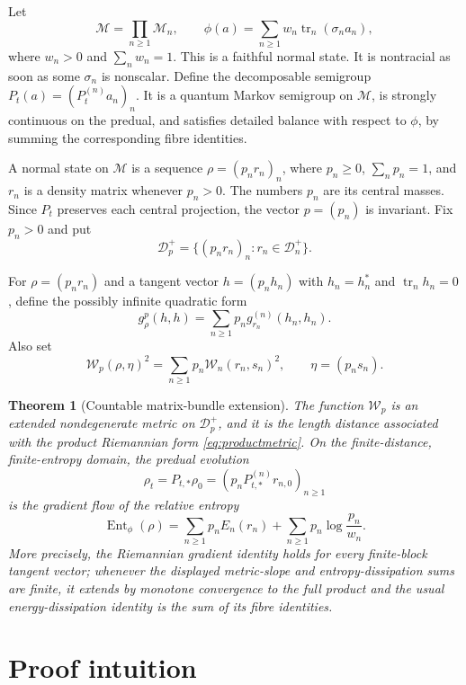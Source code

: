 \documentclass[11pt]{article}
\newtheorem{theorem}{Theorem}
\newcommand{\M}{\mathcal M}
\newcommand{\D}{\mathcal D}
\newcommand{\W}{\mathcal W}
\newcommand{\tr}{\operatorname{tr}}
\newcommand{\Ent}{\operatorname{Ent}}
\begin{document}
Let
\[
  \M=\prod_{n\geq1}\M_n,
  \qquad
  \phi(a)=\sum_{n\geq1}w_n\tr_n(\sigma_n a_n),
\]
where $w_n>0$ and $\sum_nw_n=1$.  This is a faithful normal state.  It is
nontracial as soon as some $\sigma_n$ is nonscalar.  Define the decomposable
semigroup $P_t(a)=(P_t^{(n)}a_n)_n$.  It is a quantum Markov semigroup on
$\M$, is strongly continuous on the predual, and satisfies detailed balance
with respect to $\phi$, by summing the corresponding fibre identities.

A normal state on $\M$ is a sequence $\rho=(p_nr_n)_n$, where $p_n\geq0$,
$\sum_np_n=1$, and $r_n$ is a density matrix whenever $p_n>0$.  The numbers
$p_n$ are its central masses.  Since $P_t$ preserves each central projection,
the vector $p=(p_n)$ is invariant.  Fix $p_n>0$ and put
\[
  \D_p^+=\{(p_nr_n)_n:r_n\in\D_n^+\}.
\]

For $\rho=(p_nr_n)$ and a tangent vector
$h=(p_nh_n)$ with $h_n=h_n^*$ and $\tr_nh_n=0$, define the possibly infinite
quadratic form
\begin{equation}\label{eq:productmetric}
  g^p_\rho(h,h)=\sum_{n\geq1}p_n g^{(n)}_{r_n}(h_n,h_n).
\end{equation}
Also set
\begin{equation}\label{eq:productdistance}
  \W_p(\rho,\eta)^2
  =\sum_{n\geq1}p_n\W_n(r_n,s_n)^2,
  \qquad \eta=(p_ns_n).
\end{equation}

\begin{theorem}[Countable matrix-bundle extension]\label{thm:main}
The function $\W_p$ is an extended nondegenerate metric on $\D_p^+$, and it
is the length distance associated with the product Riemannian form
\eqref{eq:productmetric}.  On the finite-distance, finite-entropy domain, the
predual evolution
\[
 \rho_t=P_{t,*}\rho_0
       =(p_nP_{t,*}^{(n)}r_{n,0})_{n\geq1}
\]
is the gradient flow of the relative entropy
\[
 \Ent_\phi(\rho)
 =\sum_{n\geq1}p_nE_n(r_n)
  +\sum_{n\geq1}p_n\log\frac{p_n}{w_n}.
\]
More precisely, the Riemannian gradient identity holds for every finite-block
tangent vector; whenever the displayed metric-slope and entropy-dissipation
sums are finite, it extends by monotone convergence to the full product and
the usual energy-dissipation identity is the sum of its fibre identities.
\end{theorem}

\section{Proof intuition}
\end{document}
